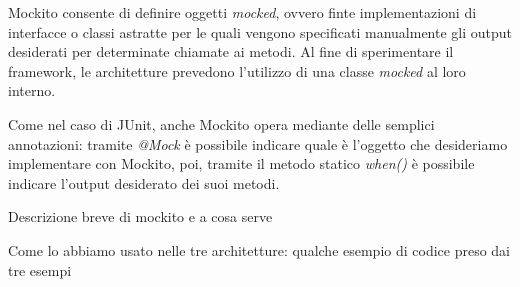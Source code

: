 Mockito consente di definire oggetti \emph{mocked}, ovvero finte implementazioni di interfacce o classi astratte per le quali vengono specificati manualmente gli output desiderati per determinate chiamate ai metodi. Al fine di sperimentare il framework, le architetture prevedono l'utilizzo di una classe \emph{mocked} al loro interno. 

Come nel caso di JUnit, anche Mockito opera mediante delle semplici annotazioni: tramite \emph{@Mock} è possibile indicare quale è l'oggetto che desideriamo implementare con Mockito, poi, tramite il metodo statico \emph{when()} è possibile indicare l'output desiderato dei suoi metodi.



Descrizione breve di mockito e a cosa serve

Come lo abbiamo usato nelle tre architetture: qualche esempio di codice preso dai tre esempi
